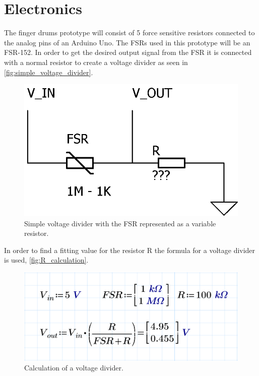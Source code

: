 \section{Electronics}
\label{electronics}
The finger drums prototype will consist of 5 force sensitive resistors connected to the analog pins of an Arduino Uno. The FSRs used in this prototype will be an FSR-152. In order to get the desired output signal from the FSR it is connected with a normal resistor to create a voltage divider as seen in \autoref{fig:simple_voltage_divider}. 
\begin{figure}[H]
\centering
\includegraphics[scale=1.5]{Figure/simple_voltage_divider.png}
\caption{Simple voltage divider with the FSR represented as a variable resistor. }
\label{fig:simple_voltage_divider}
\end{figure}

In order to find a fitting value for the resistor R the formula for a voltage divider is used, \autoref{fig:R_calculation}.
\begin{figure}[H]
\centering
\includegraphics[scale=0.15]{Figure/R_calculation.png}
\caption{Calculation of a voltage divider.}
\label{fig:R_calculation}
\end{figure}

